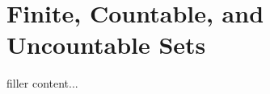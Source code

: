 \section{Finite, Countable, and Uncountable Sets}\label{sec:finite-countable-and-uncountable-sets}

filler content...


